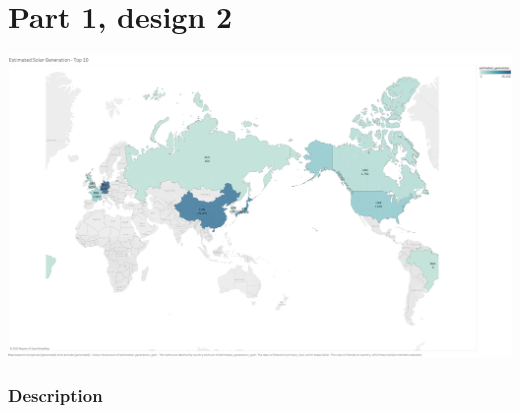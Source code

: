 \hypertarget{part-1-design-2}{%
\section{Part 1, design 2}\label{part-1-design-2}}

\centering
\includegraphics[width=15cm]{Viz2.png}

\hypertarget{description}{%
\subsubsection{Description}\label{description}}

